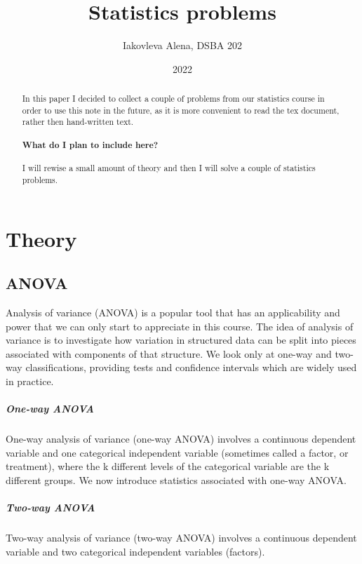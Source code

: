 \documentclass[10pt,a4paper]{report}
\title{Statistics problems}
\author{Iakovleva Alena, DSBA 202}
\date{2022}
\begin{document}
\maketitle

\begin{abstract}
In this paper I decided to collect a couple of problems from our statistics course in order to use this note in the future, as it is more convenient to read the tex document, rather then hand-written text.

\paragraph{What do I plan to include here?}
I will rewise a small amount of theory and then I will solve a couple of statistics problems. 
\end{abstract}

\tableofcontents 
\chapter{Theory}
\section{ANOVA}
Analysis of variance (ANOVA) is a popular tool that has an applicability and power that we can only start to appreciate in this course. The idea of analysis of variance is to investigate how variation in structured data can be split into pieces associated with components of that structure. We look only at one-way and two-way classifications, providing tests and confidence intervals which are widely used in practice.

\paragraph{One-way ANOVA}
One-way analysis of variance (one-way ANOVA) involves a continuous dependent variable and one categorical independent variable (sometimes called a factor, or treatment), where the k different levels of the categorical variable are the k different groups. We now introduce statistics associated with one-way ANOVA.

\paragraph{Two-way ANOVA}
Two-way analysis of variance (two-way ANOVA) involves a continuous dependent variable and two categorical independent variables (factors).
\end{document}
